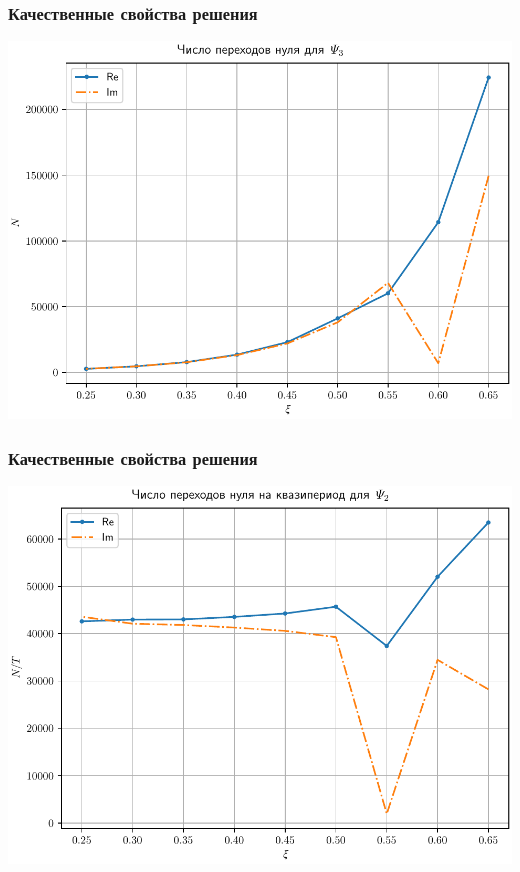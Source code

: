 \documentclass[utf8,9pt,mathserif,usepdftitle=false]{beamer}
\begin{document}
\begin{frame}
	\frametitle{Качественные свойства решения}%
	\includegraphics[width=\linewidth]{psi3-trans-ru}
\end{frame}

\begin{frame}
	\frametitle{Качественные свойства решения}%
	\includegraphics[width=\linewidth]{psi2-rel-trans-ru}
\end{frame}
\end{document}

